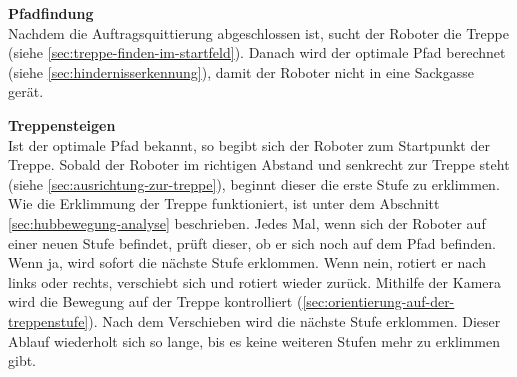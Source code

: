 \textbf{Pfadfindung}\\
Nachdem die Auftragsquittierung abgeschlossen ist, sucht der Roboter die Treppe (siehe \ref{sec:treppe-finden-im-startfeld}). Danach wird der optimale Pfad berechnet (siehe \ref{sec:hindernisserkennung}), damit der Roboter nicht in eine Sackgasse gerät. 

\textbf{Treppensteigen}\\
Ist der optimale Pfad bekannt, so begibt sich der Roboter zum Startpunkt der Treppe.  Sobald der Roboter im richtigen Abstand und senkrecht zur Treppe steht (siehe \ref{sec:ausrichtung-zur-treppe}), beginnt dieser die erste Stufe zu erklimmen. Wie die Erklimmung der Treppe funktioniert, ist unter dem Abschnitt \ref{sec:hubbewegung-analyse} beschrieben. Jedes Mal, wenn sich der Roboter auf einer neuen Stufe befindet, prüft dieser, ob er sich noch auf dem Pfad befinden. Wenn ja, wird sofort die nächste Stufe erklommen. Wenn nein, rotiert er nach links oder rechts, verschiebt sich und rotiert wieder zurück. Mithilfe der Kamera wird die Bewegung auf der Treppe kontrolliert (\ref{sec:orientierung-auf-der-treppenstufe}). Nach dem Verschieben wird die nächste Stufe erklommen. Dieser Ablauf wiederholt sich so lange, bis es keine weiteren Stufen mehr zu erklimmen gibt.

